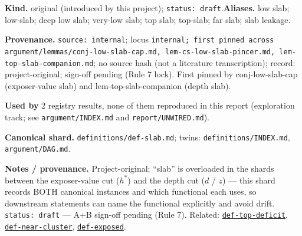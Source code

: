 \begin{defnote}
\textbf{Kind.} original (introduced by this project); \texttt{status: draft}.\quad\textbf{Aliases.} low slab; low-slab; deep low slab; very-low slab; top slab; top-slab; far slab; slab leakage.
\par
\textbf{Provenance.} \texttt{source: internal}; locus \texttt{internal;\allowbreak{} first pinned across argument/\allowbreak{}lemmas/\allowbreak{}conj-\allowbreak{}low-\allowbreak{}slab-\allowbreak{}cap.\allowbreak{}md,\allowbreak{} lem-\allowbreak{}cs-\allowbreak{}low-\allowbreak{}slab-\allowbreak{}pincer.\allowbreak{}md,\allowbreak{} lem-\allowbreak{}top-\allowbreak{}slab-\allowbreak{}companion.\allowbreak{}md}; no source hash (not a literature transcription); record: project-\allowbreak{}original;\allowbreak{} sign-\allowbreak{}off pending (Rule 7 lock).\allowbreak{} First pinned by conj-\allowbreak{}low-\allowbreak{}slab-\allowbreak{}cap (exposer-\allowbreak{}value slab) and lem-\allowbreak{}top-\allowbreak{}slab-\allowbreak{}companion (depth slab).
\par
\textbf{Used by} 2 registry results, none of them reproduced in this report (exploration track; see \texttt{argument/INDEX.md} and \texttt{report/UNWIRED.md}).
\par
\textbf{Canonical shard.} \texttt{definitions/\allowbreak{}def-\allowbreak{}slab.\allowbreak{}md}; twins: \texttt{definitions/INDEX.md}, \texttt{argument/DAG.md}.
\par
\textbf{Notes / provenance.} Project-original; ``slab'' is overloaded in the shards between the
exposer-value cut ($h^*$) and the depth cut ($d$ / $z$) --- this shard records BOTH canonical instances
and which functional each uses, so downstream statements can name the functional explicitly and avoid
drift. \texttt{status:\allowbreak{} draft} --- A+B sign-off pending (Rule 7). Related: \hyperref[def:top-deficit]{\texttt{def-\allowbreak{}top-\allowbreak{}deficit}},
\hyperref[def:near-cluster]{\texttt{def-\allowbreak{}near-\allowbreak{}cluster}}, \hyperref[def:exposed]{\texttt{def-\allowbreak{}exposed}}.
\end{defnote}
